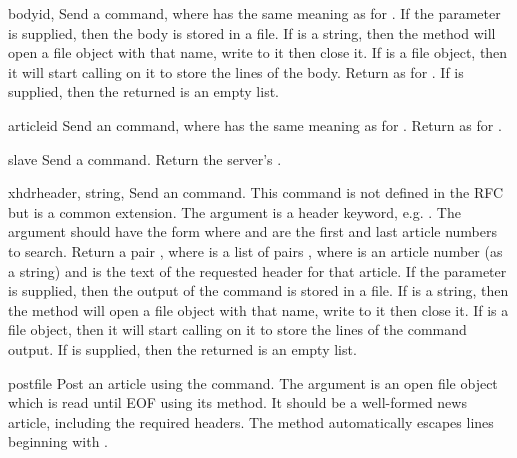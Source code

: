 \begin{methoddesc}{body}{id,}
Send a  command, where  has the same meaning as for
.  If the  parameter is supplied, then
the body is stored in a file.  If  is a string, then
the method will open a file object with that name, write to it then close it.
If  is a file object, then it will start calling
 on it to store the lines of the body.
Return as for .  If  is supplied, then
the returned  is an empty list.
\end{methoddesc}

\begin{methoddesc}{article}{id}
Send an  command, where  has the same meaning as
for .  Return as for .
\end{methoddesc}

\begin{methoddesc}{slave}{}
Send a  command.  Return the server's .
\end{methoddesc}

\begin{methoddesc}{xhdr}{header, string, }
Send an  command.  This command is not defined in the RFC
but is a common extension.  The  argument is a header
keyword, e.g. .  The  argument should have
the form  where  and
 are the first and last article numbers to search.  Return a
pair , where  is a list of
pairs , where  is an article number
(as a string) and  is the text of the requested header for
that article.
If the  parameter is supplied, then the output of the 
 command is stored in a file.  If  is a string, 
then the method will open a file object with that name, write to it 
then close it.  If  is a file object, then it will start
calling  on it to store the lines of the command output.
If  is supplied, then the returned  is an empty list.
\end{methoddesc}

\begin{methoddesc}{post}{file}
Post an article using the  command.  The 
argument is an open file object which is read until EOF using its
 method.  It should be a well-formed news article,
including the required headers.  The  method
automatically escapes lines beginning with .
\end{methoddesc}

